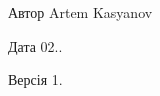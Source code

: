 \begin{DoxyAuthor}{Автор}
Artem Kasyanov 
\end{DoxyAuthor}
\begin{DoxyDate}{Дата}
02.. 
\end{DoxyDate}
\begin{DoxyVersion}{Версія}
1. 
\end{DoxyVersion}
